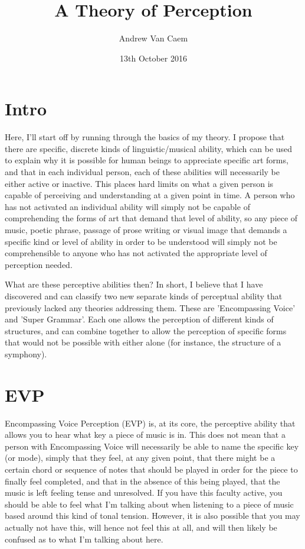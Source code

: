 \documentclass[]{article}
\title{A Theory of Perception}
\author{Andrew Van Caem}
\date{13th October 2016}
\begin{document}
\maketitle

\section{Intro}
Here, I'll start off by running through the basics of my theory. I propose that there are specific, discrete kinds of linguistic/musical ability, which can be used to explain why it is possible for human beings to appreciate specific art forms, and that in each individual person, each of these abilities will necessarily be either active or inactive. This places hard limits on what a given person is capable of perceiving and understanding at a given point in time. A person who has not activated an individual ability will simply not be capable of comprehending the forms of art that demand that level of ability, so any piece of music, poetic phrase, passage of prose writing or visual image that demands a specific kind or level of ability in order to be understood will simply not be comprehensible to anyone who has not activated the appropriate level of perception needed.

What are these perceptive abilities then? In short, I believe that I have discovered and can classify two new separate kinds of perceptual ability that previously lacked any theories addressing them. These are 'Encompassing Voice' and 'Super Grammar'. Each one allows the perception of different kinds of structures, and can combine together to allow the perception of specific forms that would not be possible with either alone (for instance, the structure of a symphony).

\section{EVP}

Encompassing Voice Perception (EVP) is, at its core, the perceptive ability that allows you to hear what key a piece of music is in. This does not mean that a person with Encompassing Voice will necessarily be able to name the specific key (or mode), simply that they feel, at any given point, that there might be a certain chord or sequence of notes that should be played in order for the piece to finally feel completed, and that in the absence of this being played, that the music is left feeling tense and unresolved. If you have this faculty active, you should be able to feel what I'm talking about when listening to a piece of music based around this kind of tonal tension. However, it is also possible that you may actually not have this, will hence not feel this at all, and will then likely be confused as to what I'm talking about here.
\end{document}
